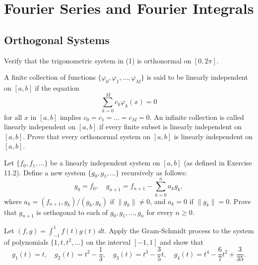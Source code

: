 \chapter{Fourier Series and Fourier Integrals}

\section{Orthogonal Systems}

\begin{problembox}
Verify that the trigonometric system in (1) is orthonormal on $[0, 2\pi]$.
\end{problembox}

\begin{problembox}
A finite collection of functions $\{\varphi_0, \varphi_1, \dots, \varphi_M\}$ is said to be linearly independent on $[a, b]$ if the equation
\[
\sum_{k=0}^M c_k \varphi_k(x) = 0
\]
for all $x$ in $[a, b]$ implies $c_0 = c_1 = \dots = c_M = 0$. An infinite collection is called linearly independent on $[a, b]$ if every finite subset is linearly independent on $[a, b]$. Prove that every orthonormal system on $[a, b]$ is linearly independent on $[a, b]$.
\end{problembox}

\begin{problembox}
Let $\{f_0, f_1, \dots\}$ be a linearly independent system on $[a, b]$ (as defined in Exercise 11.2). Define a new system $\{g_0, g_1, \dots\}$ recursively as follows:
\[
g_0 = f_0, \quad g_{n+1} = f_{n+1} - \sum_{k=0}^n a_k g_k,
\]
where $a_k = (f_{n+1}, g_k)/(g_k, g_k)$ if $\|g_k\| \neq 0$, and $a_k = 0$ if $\|g_k\| = 0$. Prove that $g_{n+1}$ is orthogonal to each of $g_0, g_1, \dots, g_n$ for every $n \geq 0$.
\end{problembox}

\begin{problembox}
Let $(f, g) = \int_{-1}^1 f(t)g(t) \, dt$. Apply the Gram-Schmidt process to the system of polynomials $\{1, t, t^2, \dots\}$ on the interval $[-1, 1]$ and show that
\[
g_1(t) = t, \quad g_2(t) = t^2 - \frac{1}{3}, \quad g_3(t) = t^3 - \frac{3}{5}t, \quad g_4(t) = t^4 - \frac{6}{7}t^2 + \frac{3}{35}.
\]
\end{problembox}


